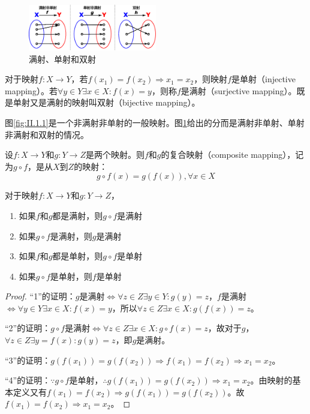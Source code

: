 \documentclass[../main.tex]{subfiles}
\begin{document}
\begin{figure}[htbp]
    \centering
    \includegraphics[width=0.5\textwidth]{../images/II.1.2.eps}
    \caption{满射、单射和双射}
    \label{fig:II.1.2}
\end{figure}

\begin{definition}[单射、双射、满射]
    对于映射$f:X\rightarrow Y$，若$f\left(x_1\right)=f\left(x_2\right)\Rightarrow x_1=x_2$，则映射$f$是单射（injective mapping）。若$\forall y\in Y\exists x\in X:f\left(x\right)=y$，则称$f$是满射（surjective mapping）。既是单射又是满射的映射叫双射（bijective mapping）。
\end{definition}

图\ref{fig:II.1.1}是一个非满射非单射的一般映射。图\ref{fig:II.1.2}给出的分而是满射非单射、单射非满射和双射的情况。

\begin{definition}[复合映射]
    设$f:X\rightarrow Y$和$g:Y\rightarrow Z$是两个映射。则$f$和$g$的复合映射（composite mapping），记为$g\circ f$，是从$X$到$Z$的映射：
    \[g\circ f\left(x\right)=g\left(f\left(x\right)\right),\forall x\in X\]
\end{definition}

\begin{theorem}
    对于映射$f:X\rightarrow Y$和$g: Y\rightarrow Z$，
    \begin{enumerate}
        \item 如果$f$和$g$都是满射，则$g\circ f$是满射
        \item 如果$g\circ f$是满射，则$g$是满射
        \item 如果$f$和$g$都是单射，则$g\circ f$是单射
        \item 如果$g\circ f$是单射，则$f$是单射
    \end{enumerate}
\end{theorem}
\begin{proof}
    “1”的证明：$g$是满射$\Leftrightarrow\forall z\in Z\exists y\in Y:g\left(y\right)=z$，$f$是满射$\Leftrightarrow\forall y\in Y\exists x\in X:f\left(x\right)=y$，所以$\forall z\in Z\exists x\in X:g\left(f\left(x\right)\right)=z$。

    “2”的证明：$g\circ f$是满射$\Leftrightarrow\forall z\in Z\exists x\in X:g\circ f\left(x\right)=z$，故对于$g$，$\forall z\in Z\exists y=f\left(x\right):g\left(y\right)=z$，即$g$是满射。

    “3”的证明：$g\left(f\left(x_1\right)\right)=g\left(f\left(x_2\right)\right)\Rightarrow f\left(x_1\right)=f\left(x_2\right)\Rightarrow x_1=x_2$。

    “4”的证明：$\because g\circ f$是单射，$\therefore g\left(f\left(x_1\right)\right)=g\left(f\left(x_2\right)\right)\Rightarrow x_1=x_2$。由映射的基本定义又有$f\left(x_1\right)=f\left(x_2\right)\Rightarrow g\left(f\left(x_1\right)\right)=g\left(f\left(x_2\right)\right)$。故$f\left(x_1\right)=f\left(x_2\right)\Rightarrow x_1=x_2$。
\end{proof}
\end{document}
